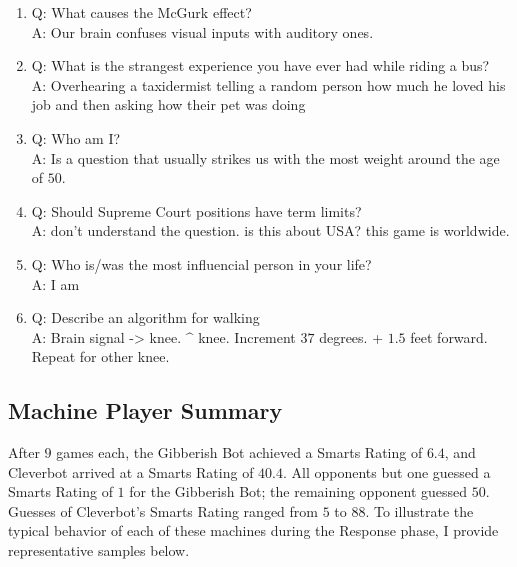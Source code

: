\begin{enumerate}
\item Q: What causes the McGurk effect?
\\ A: Our brain confuses visual inputs with auditory ones.

\item Q: What is the strangest experience you have ever had while riding a bus?
\\ A: Overhearing a taxidermist telling a random person how much he loved his job and then asking how their pet was doing

\item Q: Who am I?
\\ A: Is a question that usually strikes us with the most weight around the age of $50$.

\item Q: Should Supreme Court positions have term limits?
\\ A: don't understand the question. is this about USA? this game is worldwide.

\item Q: Who is/was the most influencial person in your life?
\\ A: I am

\item Q: Describe an algorithm for walking
\\ A: Brain signal -> knee. $\^$ knee. Increment $37$ degrees. + $1.5$ feet forward. Repeat for other knee.
\end{enumerate}

\subsection{Machine Player Summary}

After $9$ games each, the Gibberish Bot achieved a Smarts Rating of $6.4$, and Cleverbot arrived at a Smarts Rating of $40.4$. All opponents but one guessed a Smarts Rating of $1$ for the Gibberish Bot; the remaining opponent guessed $50$. Guesses of Cleverbot's Smarts Rating ranged from $5$ to $88$. To illustrate the typical behavior of each of these machines during the Response phase, I provide representative samples below.

